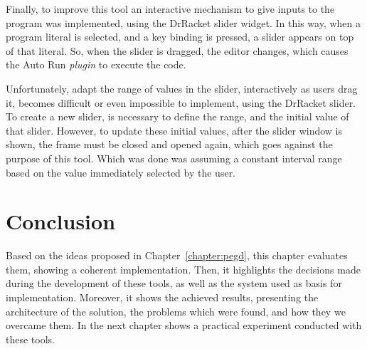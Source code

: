Finally, to improve this tool an interactive mechanism to give inputs to the program was implemented, using the DrRacket slider widget. In this way, when a program literal is selected, and a key binding is pressed, a slider appears on top of that literal. So, when the slider is dragged, the editor changes, which causes the Auto Run \textit{plugin} to execute the code. 

Unfortunately, adapt the range of values in the slider, interactively as users drag it, becomes difficult or even impossible to implement, using the DrRacket slider. To create a new slider, is necessary to define the range, and the initial value of that slider. However, to update these initial values, after the slider window is shown, the frame must be closed and opened again, which goes against the purpose of this tool. Which was done was assuming a constant interval range based on the value immediately selected by the user.

\section{Conclusion}

Based on the ideas proposed in Chapter~\ref{chapter:pegd}, this chapter evaluates them, showing a coherent implementation. Then, it highlights the decisions made during the development of these tools, as well as the system used as basis for implementation. Moreover, it shows the achieved results, presenting the architecture of the solution, the problems which were found, and how they we overcame them. In the next chapter shows a practical experiment conducted with these tools.